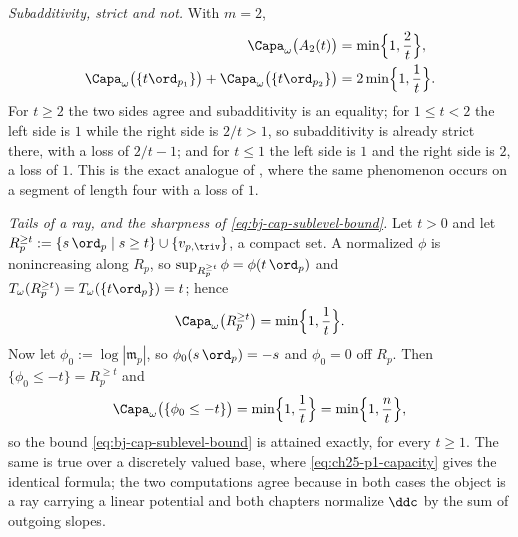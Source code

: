 \begin{example}
\emph{Subadditivity, strict and not.}  With $m=2$,
\[
 \begin{aligned}
 \Capa_\omega\bigl(A_2(t)\bigr)&=\min\Bigl\{1,\frac2t\Bigr\},\\
 \Capa_\omega\bigl(\{t\ord_{p_1}\}\bigr)
 +\Capa_\omega\bigl(\{t\ord_{p_2}\}\bigr)
 &=2\min\Bigl\{1,\frac1t\Bigr\}.
 \end{aligned}
\]
For $t\ge2$ the two sides agree and subadditivity is an equality; for
$1\le t<2$ the left side is $1$ while the right side is $2/t>1$, so
subadditivity is already strict there, with a loss of $2/t-1$; and for
$t\le1$ the left side is $1$ and the right side is $2$, a loss of
$1$.  This is the exact analogue
of , where the same phenomenon occurs on
a segment of length four with a loss of $1$.

\emph{Tails of a ray, and the sharpness of \eqref{eq:bj-cap-sublevel-bound}.}
Let $t>0$ and let
$R_p^{\ge t}:=\{s\,\ord_p\mid s\ge t\}\cup\{v_{p,\triv}\}$, a compact
set.  A normalized $\phi$ is nonincreasing along $R_p$, so
$\sup_{R_p^{\ge t}}\phi=\phi(t\,\ord_p)$ and
$T_\omega(R_p^{\ge t})=T_\omega(\{t\ord_p\})=t$; hence
\[
 \Capa_\omega\bigl(R_p^{\ge t}\bigr)=\min\Bigl\{1,\frac1t\Bigr\} .
\]
Now let $\phi_0:=\log|\mathfrak m_p|$, so $\phi_0(s\,\ord_p)=-s$ and
$\phi_0=0$ off $R_p$.  Then
$\{\phi_0\le-t\}=R_p^{\ge t}$ and
\[
 \Capa_\omega\bigl(\{\phi_0\le-t\}\bigr)=\min\Bigl\{1,\frac1t\Bigr\}
 =\min\Bigl\{1,\frac nt\Bigr\},
\]
so the bound \eqref{eq:bj-cap-sublevel-bound} is attained exactly, for
every $t\ge1$.  The same is true over a discretely valued base, where
\eqref{eq:ch25-p1-capacity} gives the identical formula; the two
computations agree because in both cases the object is a ray carrying a
linear potential and both chapters normalize $\ddc$ by the sum of
outgoing slopes.


\end{example}
